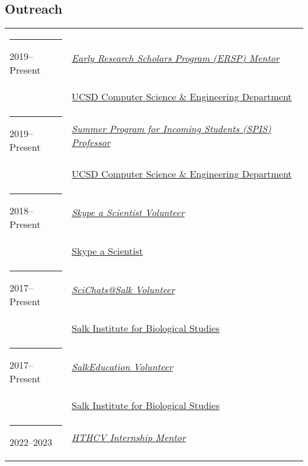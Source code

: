 \documentclass[margin,line]{res}
\begin{document}
\begin{resume}
\section{\sc Outreach}
\begin{longtable}{@{}p{0.7in}p{4in}}\rule{-1mm}{4.5mm}
\hspace*{-4mm} 2019--Present & \href{http://ersp.ucsd.edu/}{\textit{Early Research Scholars Program (ERSP) Mentor}}\\*
\hspace*{-4mm} & \hspace{4mm} \href{http://cse.ucsd.edu}{UCSD Computer Science \& Engineering Department}\\
\hspace*{-4mm} \rule{-1mm}{5mm} 2019--Present & \href{https://sites.google.com/a/eng.ucsd.edu/spis}{\textit{Summer Program for Incoming Students (SPIS) Professor}}\\*
\hspace*{-4mm} & \hspace{4mm} \href{http://cse.ucsd.edu}{UCSD Computer Science \& Engineering Department}\\
\hspace*{-4mm} \rule{-1mm}{5mm} 2018--Present & \href{https://www.skypeascientist.com/}{\textit{Skype a Scientist Volunteer}}\\*
\hspace*{-4mm} & \hspace{4mm} \href{https://www.skypeascientist.com/}{Skype a Scientist}\\
\hspace*{-4mm} \rule{-1mm}{5mm} 2017--Present & \href{http://education.salk.edu/scientist-profile-niema-moshiri/}{\textit{SciChats@Salk Volunteer}}\\*
\hspace*{-4mm} & \hspace{4mm} \href{https://www.salk.edu/}{Salk Institute for Biological Studies}\\
\hspace*{-4mm} \rule{-1mm}{5mm} 2017--Present & \href{https://www.salk.edu/about/education-outreach/}{\textit{SalkEducation Volunteer}}\\*
\hspace*{-4mm} & \hspace{4mm} \href{https://www.salk.edu/}{Salk Institute for Biological Studies}\\
\hspace*{-4mm} \rule{-1mm}{5mm} 2022--2023 & \href{http://web.hightechhigh.org/internships/}{\textit{HTHCV Internship Mentor}}\\*

\end{longtable}
\end{resume}
\end{document}
